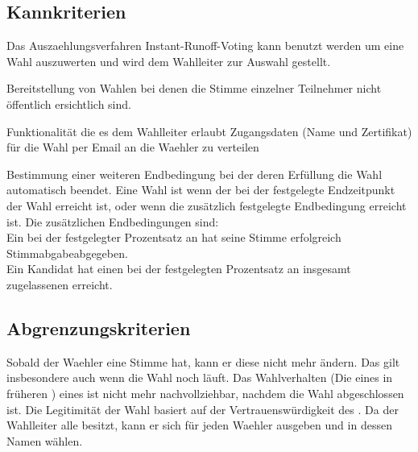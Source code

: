 \documentclass[parskip=full,11pt,twoside]{scrartcl}
\begin{document}
\subsection{Kannkriterien}

Das \gls{Auszaehlungsverfahren} \gls{Instant-Runoff-Voting} kann benutzt werden um eine Wahl auszuwerten und wird dem \gls{Wahlleiter} zur Auswahl gestellt.

Bereitstellung von Wahlen bei denen die Stimme einzelner Teilnehmer nicht öffentlich ersichtlich sind.

Funktionalität die es dem \gls{Wahlleiter} erlaubt Zugangsdaten (Name und \gls{Zertifikat}) für die \gls{Wahl} per Email an die \gls{Waehler} zu verteilen

Bestimmung einer weiteren Endbedingung bei der  deren Erfüllung die \gls{Wahl} automatisch beendet.
Eine Wahl ist  wenn der bei der  festgelegte Endzeitpunkt der Wahl erreicht ist, oder wenn die zusätzlich festgelegte Endbedingung erreicht ist.
Die zusätzlichen Endbedingungen sind:\\
Ein bei der  festgelegter Prozentsatz an  hat seine Stimme erfolgreich \gls{Stimmabgabe}{abgegeben}.\\
Ein \gls{Kandidat} hat einen bei der  festgelegten Prozentsatz an insgesamt zugelassenen  erreicht.

\subsection{Abgrenzungskriterien}
Sobald der \gls{Waehler} eine Stimme  hat, kann er diese nicht mehr ändern. Das gilt insbesondere auch wenn die \gls{Wahl} noch läuft.
Das Wahlverhalten (Die  eines  in früheren ) eines  ist nicht mehr nachvollziehbar, nachdem die \gls{Wahl} abgeschlossen ist.
Die Legitimität der \gls{Wahl} basiert auf der Vertrauenswürdigkeit des . Da der \gls{Wahlleiter} alle  besitzt, kann er sich für jeden \gls{Waehler} ausgeben und in dessen Namen wählen.
\end{document}
